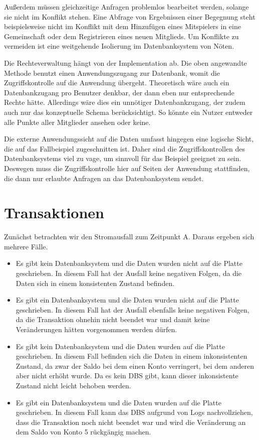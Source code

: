\documentclass[ngerman]{gdb-aufgabenblatt}
\begin{document}
		Außerdem müssen gleichzeitige Anfragen problemlos bearbeitet werden, solange sie nicht im Konflikt stehen. Eine Abfrage von Ergebnissen einer Begegnung steht beispielsweise nicht im Konflikt mit dem Hinzufügen eines Mitspielers in eine Gemeinschaft oder dem Registrieren eines neuen Mitglieds. Um Konflikte zu vermeiden ist eine weitgehende Isolierung im Datenbanksystem von Nöten.
		
		Die Rechteverwaltung hängt von der Implementation ab. Die oben angewandte Methode benutzt einen Anwendungszugang zur Datenbank, womit die Zugriffskontrolle auf die Anwendung übergeht. Theoretisch wäre auch ein Datenbankzugang pro Benutzer denkbar, der dann eben nur entsprechende Rechte hätte. Allerdings wäre dies ein unnötiger Datenbankzugang, der zudem auch nur das konzeptuelle Schema berücksichtigt. So könnte ein Nutzer entweder alle Punkte aller Mitglieder ansehen oder keine. 
		
		Die externe Anwendungssicht auf die Daten umfasst hingegen eine logische Sicht, die auf das Fallbeispiel zugeschnitten ist. Daher sind die Zugriffskontrollen des Datenbanksystems viel zu vage, um sinnvoll für das Beispiel geeignet zu sein. Deswegen muss die Zugriffskontrolle hier auf Seiten der Anwendung stattfinden, die dann nur erlaubte Anfragen an das Datenbanksystem sendet.
		
		
\section{Transaktionen}
	Zunächst betrachten wir den Stromausfall zum Zeitpunkt A. Daraus ergeben sich mehrere Fälle.
	
	\begin{itemize}
		\item	Es gibt kein Datenbanksystem und die Daten wurden nicht auf die Platte geschrieben. In diesem Fall hat der Ausfall keine negativen Folgen, da die Daten sich in einem konsistenten Zustand befinden.
		\item	Es gibt ein Datenbanksystem und die Daten wurden nicht auf die Platte geschrieben. In diesem Fall hat der Ausfall ebenfalls keine negativen Folgen, da die Transaktion ohnehin nicht beendet war und damit keine Veränderungen hätten vorgenommen werden dürfen.
		\item	Es gibt kein Datenbanksystem und die Daten wurden auf die Platte geschrieben. In diesem Fall befinden sich die Daten in einem inkonsistenten Zustand, da zwar der Saldo bei dem einen Konto verringert, bei dem anderen aber nicht erhöht wurde. Da es kein DBS gibt, kann dieser inkonsistente Zustand nicht leicht behoben werden.
		\item	Es gibt ein Datenbanksystem und die Daten wurden auf die Platte geschrieben. In diesem Fall kann das DBS aufgrund von Logs nachvollziehen, dass die Transaktion noch nicht beendet war und wird die Veränderung an dem Saldo von Konto 5 rückgängig machen.
	\end{itemize}
	
\end{document}
